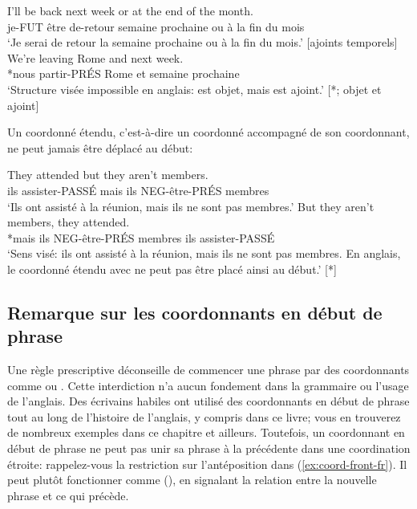 \ea \label{ex:coordinate-function-fr}
    \ea \gll I'll be back next week or at the end of the month.\\
        je-FUT être de-retour semaine prochaine ou à la fin du mois\\
    \glt `Je serai de retour la semaine prochaine ou à la fin du mois.' [ajoints temporels]
    \ex \gll *We're leaving Rome and next week.\\
        *nous partir-PRÉS Rome et semaine prochaine\\
    \glt `Structure visée impossible en anglais:  est objet, mais  est ajoint.' [*; objet et ajoint]
    \z
\z

Un coordonné étendu, c'est-à-dire un coordonné accompagné de son coordonnant, ne peut jamais être déplacé au début:

\ea \label{ex:coord-front-fr}
    \ea \gll They attended but they aren't members.\\
        ils assister-PASSÉ mais ils NEG-être-PRÉS membres\\
    \glt `Ils ont assisté à la réunion, mais ils ne sont pas membres.'
    \ex \gll *But they aren't members, they attended.\\
        *mais ils NEG-être-PRÉS membres ils assister-PASSÉ\\
    \glt `Sens visé: ils ont assisté à la réunion, mais ils ne sont pas membres. En anglais, le coordonné étendu avec  ne peut pas être placé ainsi au début.' [*]
    \z
\z

\subsection{Remarque sur les coordonnants en début de phrase}

Une règle prescriptive déconseille de commencer une phrase par des coordonnants comme  ou . Cette interdiction n'a aucun fondement dans la grammaire ou l'usage de l'anglais. Des écrivains habiles ont utilisé des coordonnants en début de phrase tout au long de l'histoire de l'anglais, y compris dans ce livre; vous en trouverez de nombreux exemples dans ce chapitre et ailleurs. Toutefois, un coordonnant en début de phrase ne peut pas unir sa phrase à la précédente dans une coordination étroite: rappelez-vous la restriction sur l'antéposition dans (\ref{ex:coord-front-fr}). Il peut plutôt fonctionner comme  (), en signalant la relation entre la nouvelle phrase et ce qui précède.

